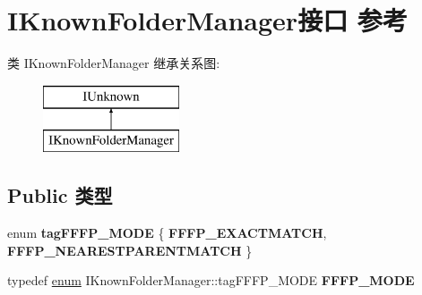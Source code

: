 \hypertarget{interface_i_known_folder_manager}{}\section{I\+Known\+Folder\+Manager接口 参考}
\label{interface_i_known_folder_manager}
类 I\+Known\+Folder\+Manager 继承关系图\+:\begin{figure}[H]
\begin{center}
\leavevmode
\includegraphics[height=2.000000cm]{interface_i_known_folder_manager}
\end{center}
\end{figure}
\subsection*{Public 类型}
\begin{DoxyCompactItemize}
\item 
\mbox{\label{interface_i_known_folder_manager_ad70b5096cee0647c407b98194b6ceec5}} 
enum {\bfseries tag\+F\+F\+F\+P\+\_\+\+M\+O\+DE} \{ {\bfseries F\+F\+F\+P\+\_\+\+E\+X\+A\+C\+T\+M\+A\+T\+CH}, 
{\bfseries F\+F\+F\+P\+\_\+\+N\+E\+A\+R\+E\+S\+T\+P\+A\+R\+E\+N\+T\+M\+A\+T\+CH}
 \}
\item 
\mbox{\label{interface_i_known_folder_manager_a0c2a4c1f57a9f62cafffa124832f3601}} 
typedef \hyperlink{interfaceenum}{enum} I\+Known\+Folder\+Manager\+::tag\+F\+F\+F\+P\+\_\+\+M\+O\+DE {\bfseries F\+F\+F\+P\+\_\+\+M\+O\+DE}
\end{DoxyCompactItemize}
